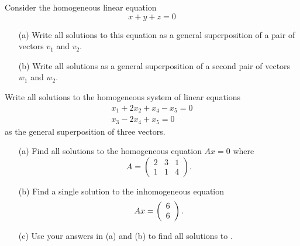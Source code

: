 \documentclass{ximera}
\begin{document}
\EXER

\TEXER

\begin{exercise} \label{c4.4.1}
Consider the homogeneous linear equation
\[
x+y+z = 0
\]
\begin{enumerate}
\item[(a)]  Write all solutions to this equation as a general
superposition of a pair of vectors $v_1$ and $v_2$.
\item[(b)]  Write all solutions as a general superposition of
a second pair of vectors $w_1$ and $w_2$.
\end{enumerate}
\end{exercise}

\begin{exercise} \label{c4.4.2}
Write all solutions to the homogeneous system of linear
equations
\begin{eqnarray*}
x_1+2x_2+x_4-x_5 = 0\\
x_3-2x_4+x_5 = 0
\end{eqnarray*}
as the general superposition of three vectors.
\end{exercise}

\begin{exercise} \label{c4.4.3}
\begin{itemize}
\item[(a)] Find all solutions to the homogeneous equation
$Ax=0$ where
\[
A = \left(\begin{array}{ccc} 2 & 3 & 1 \\ 1 & 1 & 4 \end{array}
\right).
\]
\item[(b)] Find a single solution to the inhomogeneous equation
\begin{equation}  \label{E:inhom}
Ax =\left(\begin{array}{r} 6 \\ 6\end{array}\right).
\end{equation}
\item[(c)] Use your answers in (a) and (b) to find all solutions
to .
\end{itemize}
\end{exercise}
\end{document}
